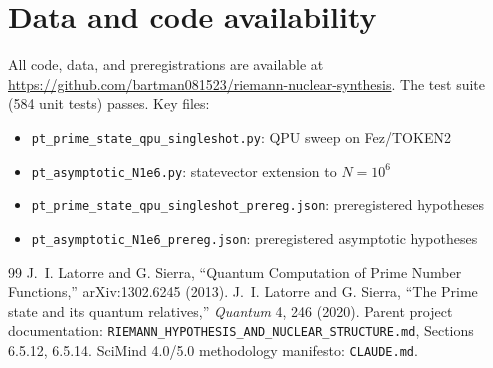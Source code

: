 \documentclass[11pt,a4paper]{article}
\begin{document}
\section*{Data and code availability}

All code, data, and preregistrations are available at \url{https://github.com/bartman081523/riemann-nuclear-synthesis}. The test suite (584 unit tests) passes. Key files:
\begin{itemize}
\item \texttt{pt\_prime\_state\_qpu\_singleshot.py}: QPU sweep on Fez/TOKEN2
\item \texttt{pt\_asymptotic\_N1e6.py}: statevector extension to $N = 10^6$
\item \texttt{pt\_prime\_state\_qpu\_singleshot\_prereg.json}: preregistered hypotheses
\item \texttt{pt\_asymptotic\_N1e6\_prereg.json}: preregistered asymptotic hypotheses
\end{itemize}

\begin{thebibliography}{99}
 J.~I. Latorre and G. Sierra, ``Quantum Computation of Prime Number Functions,'' arXiv:1302.6245 (2013).
 J.~I. Latorre and G. Sierra, ``The Prime state and its quantum relatives,'' \emph{Quantum} 4, 246 (2020).
 Parent project documentation: \texttt{RIEMANN\_HYPOTHESIS\_AND\_NUCLEAR\_STRUCTURE.md}, Sections 6.5.12, 6.5.14.
 SciMind 4.0/5.0 methodology manifesto: \texttt{CLAUDE.md}.
\end{thebibliography}
\end{document}
